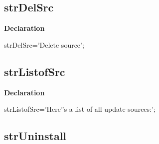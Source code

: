 \documentclass{report}
\newif\ifpdf
\begin{document}
\subsection*{strDelSrc}
\fi
\label{trstrings-strDelSrc}
\begin{list}{}{
\setlength{\itemindent}{0cm}
\setlength{\listparindent}{0cm}
\setlength{\leftmargin}{\evensidemargin}
\addtolength{\leftmargin}{\tmplength}
\settowidth{\labelsep}{X}
\addtolength{\leftmargin}{\labelsep}
\setlength{\labelwidth}{\tmplength}
}
\item[\textbf{Declaration}\hfill]
\ifpdf
\begin{flushleft}
\fi
\begin{ttfamily}
strDelSrc='Delete source';\end{ttfamily}

\ifpdf
\end{flushleft}
\fi

\end{list}
\ifpdf
\subsection*{\large{\textbf{strListofSrc}}\normalsize\hspace{1ex}\hrulefill}
\else
\subsection*{strListofSrc}
\fi
\label{trstrings-strListofSrc}
\begin{list}{}{
\setlength{\itemindent}{0cm}
\setlength{\listparindent}{0cm}
\setlength{\leftmargin}{\evensidemargin}
\addtolength{\leftmargin}{\tmplength}
\settowidth{\labelsep}{X}
\addtolength{\leftmargin}{\labelsep}
\setlength{\labelwidth}{\tmplength}
}
\item[\textbf{Declaration}\hfill]
\ifpdf
\begin{flushleft}
\fi
\begin{ttfamily}
strListofSrc='Here''s a list of all update-sources:';\end{ttfamily}

\ifpdf
\end{flushleft}
\fi

\end{list}
\ifpdf
\subsection*{\large{\textbf{strUninstall}}\normalsize\hspace{1ex}\hrulefill}
\else
\end{document}
